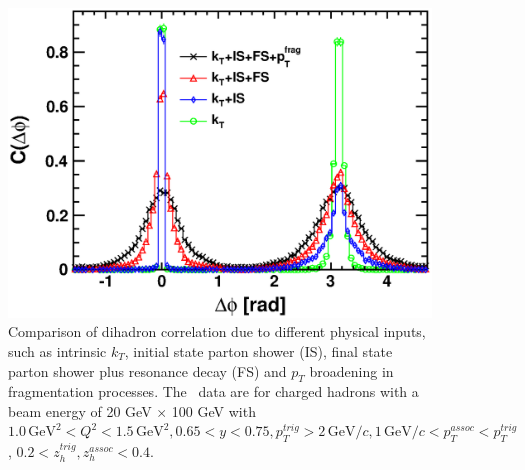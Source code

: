 \begin{figure}
\begin{center}
\includegraphics[width=1.0\textwidth]
{plots/chpt6/deltaPhi_20x100_Q2_1_y_0.7_Effects_decay.eps}
\end{center} 
\caption[The impact of effects at initial and final state in Monte Carlo on the azimuthal dihadron correlation function]
{
Comparison of dihadron correlation due to different physical inputs, such as 
intrinsic $k_T$, initial state parton shower (IS), final state parton shower plus 
resonance decay (FS) and $p_T$ broadening in fragmentation processes.
The \ep\ data are for charged hadrons with a beam energy of 20 GeV $\times$ 100 GeV 
with $1.0 \, \mathrm{GeV}^{2}  < Q^{2} < 1.5 \, \textrm{GeV}^2, 0.65 < y < 0.75, p_{T}^{trig} > 2 \,
\mathrm{GeV/}c, 1 \, \mathrm{GeV/}c < p_{T}^{assoc} < p_{T}^{trig}$, $0.2 <
z_{h}^{trig}, z_{h}^{assoc} < 0.4$. 
}
\label{fig:dihadron_effects}
\end{figure}

